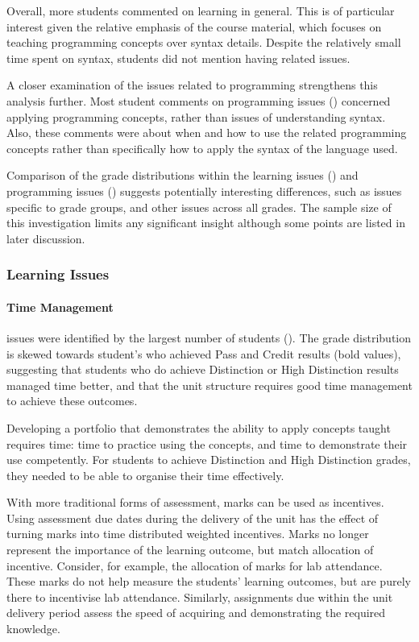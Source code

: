 Overall, more students commented on learning in general. This is of particular interest given the relative emphasis of the course material, which focuses on teaching programming concepts over syntax details. Despite the relatively small time spent on syntax, students did not mention having related issues.

A closer examination of the issues related to programming strengthens this analysis further. Most student comments on programming issues () concerned applying programming concepts, rather than issues of understanding syntax. Also, these comments were about when and how to use the related programming concepts rather than specifically how to apply the syntax of the language used. 

Comparison of the grade distributions within the learning issues () and programming issues () suggests potentially interesting differences, such as issues specific to grade groups, and other issues across all grades. The sample size of this investigation limits any significant insight although some points are listed in later discussion.


\subsubsection{Learning Issues}

\paragraph{Time Management} %
\label{ssub:time_management}

issues were identified by the largest number of students (). The grade distribution is skewed towards student's who achieved Pass and Credit results (bold values), suggesting that students who do achieve Distinction or High Distinction results managed time better, and that the unit structure requires good time management to achieve these outcomes.

Developing a portfolio that demonstrates the ability to apply concepts taught requires time: time to practice using the concepts, and time to demonstrate their use competently. For students to achieve Distinction and High Distinction grades, they needed to be able to organise their time effectively. 

With more traditional forms of assessment, marks can be used as incentives. Using assessment due dates during the delivery of the unit has the effect of turning marks into time distributed weighted incentives. Marks no longer represent the importance of the learning outcome, but match allocation of incentive. Consider, for example, the allocation of marks for lab attendance. These marks do not help measure the students' learning outcomes, but are purely there to incentivise lab attendance. Similarly, assignments due within the unit delivery period assess the speed of acquiring and demonstrating the required knowledge. 

